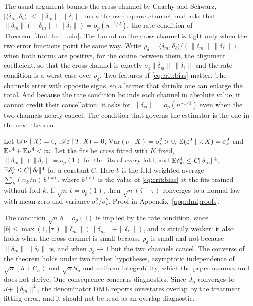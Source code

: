 The usual argument bounds the cross channel by Cauchy and Schwarz, $|\langle\delta_m,\delta_\ell\rangle| \le \|\delta_m\|\,\|\delta_\ell\|$, adds the own square channel, and asks that $\|\delta_m\|(\|\delta_m\| + \|\delta_\ell\|) = o_p(n^{-1/2})$, the rate condition of Theorem~\ref{dml:thm:main}. The bound on the cross channel is tight only when the two error functions point the same way. Write $\rho_\delta = \langle\delta_m,\delta_\ell\rangle/(\|\delta_m\|\,\|\delta_\ell\|)$, when both norms are positive, for the cosine between them, the alignment coefficient, so that the cross channel is exactly $\rho_\delta\|\delta_m\|\,\|\delta_\ell\|$ and the rate condition is a worst case over $\rho_\delta$. Two features of \eqref{eq:crit:bias} matter. The channels enter with opposite signs, so a learner that shrinks one can enlarge the total. And because the rate condition bounds each channel in absolute value, it cannot credit their cancellation: it asks for $\|\delta_m\| = o_p(n^{-1/4})$ even when the two channels nearly cancel. The condition that governs the estimator is the one in the next theorem.

\begin{theorem}\label{crit:thm:sharp}
Let $\mathbb{E}(\nu \mid X) = 0$, $\mathbb{E}(\varepsilon \mid T, X) = 0$, $\mathrm{Var}(\nu \mid X) = \sigma_\nu^2 > 0$, $\mathbb{E}(\varepsilon^2 \mid \nu, X) = \sigma_\varepsilon^2$ and $\mathbb{E}\varepsilon^4 + \mathbb{E}\nu^4 < \infty$. Let the fits be cross fitted with $K$ fixed, $\|\delta_m\| + \|\delta_\ell\| = o_p(1)$ for the fits of every fold, and $\mathbb{E}\delta_m^4 \le C\|\delta_m\|^4$, $\mathbb{E}\delta_\ell^4 \le C\|\delta_\ell\|^4$ for a constant $C$. Here $b$ is the fold weighted average $\sum_k (n_k/n)\,b^{(k)}$, where $b^{(k)}$ is the value of \eqref{eq:crit:bias} at the fits trained without fold $k$. If $\sqrt n\,b = o_p(1)$, then $\sqrt n(\hat\tau - \tau)$ converges to a normal law with mean zero and variance $\sigma_\varepsilon^2/\sigma_\nu^2$. Proof in Appendix~\ref{app:dmlproofs}.
\end{theorem}

The condition $\sqrt n\,b = o_p(1)$ is implied by the rate condition, since $|b| \le \max(1, |\tau|)\,\|\delta_m\|(\|\delta_m\| + \|\delta_\ell\|)$, and is strictly weaker: it also holds when the cross channel is small because $\rho_\delta$ is small and not because $\|\delta_m\|\,\|\delta_\ell\|$ is, and when $\rho_\delta \to 1$ but the two channels cancel. The converse of the theorem holds under two further hypotheses, asymptotic independence of $\sqrt n(b + C_n)$ and $\sqrt n S_n$ and uniform integrability, which the paper assumes and does not derive. One consequence concerns diagnostics. Since $\hat J_n$ converges to $J + \|\delta_m\|^2$, the denominator DML reports overstates overlap by the treatment fitting error, and it should not be read as an overlap diagnostic.

